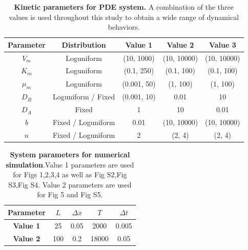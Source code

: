 \documentclass[10pt,letterpaper]{article}
\begin{document}
\begin{table}[H]
    \centering
    \renewcommand{\arraystretch}{1.3} %
    \begin{tabular}{|c|c|c|c|c|}
        \hline
        \textbf{Parameter} & \textbf{Distribution} & \textbf{Value 1} & \textbf{Value 2} & \textbf{Value 3} \\
        \hline
        $V_{m}$ & Loguniform & (10, 1000) & (10, 10000) & (10, 10000) \\
        \hline
        $K_{m}$ & Loguniform & (0.1, 250) & (0.1, 100) & (0.1, 100) \\
        \hline
        $\mu_{m}$ & Loguniform & (0.001, 50) & (1, 100)& (1, 100) \\
        \hline
        $D_{B}$ & Loguniform / Fixed & (0.001, 10) & 0.01 & 10 \\
        \hline
        $D_{A}$ & Fixed & 1 & 10 & 0.01 \\
        \hline
        $b$ & Fixed / Loguniform & 0.01 & (10, 10000) &  (10, 10000) \\
        \hline
        $n$ & Fixed / Loguniform & 2 & (2, 4) & (2, 4) \\
        \hline
    \end{tabular}
        \vspace{10pt}

    \caption{\textbf{Kinetic parameters for PDE system.} A combination of the three values is used throughout this study to obtain a wide range of dynamical behaviors.}
    \label{tab:sup_table1}
\end{table}




\begin{table}[H]
    \centering
    \renewcommand{\arraystretch}{1.3} %
    \begin{tabular}{|c|c|c|c|c|}
        \hline
        \textbf{Parameter} & $L$ & $\Delta x$ & $T$ & $\Delta t$ \\
        \hline
        \textbf{Value 1} & 25 & 0.05 & 2000 & 0.005 \\
        \hline
        \textbf{Value 2} & 100 & 0.2 & 18000 & 0.05 \\
        
        \hline
    \end{tabular}
    \vspace{10pt}
    \caption{\textbf{System parameters for numerical simulation}.Value 1 parameters are used for Figs 1,2,3,4 as well as Fig S2,Fig S3,Fig S4. Value 2 parameters are used for Fig 5 and Fig S5.}
    \label{tab:sup_table2}
\end{table}
\end{document}
